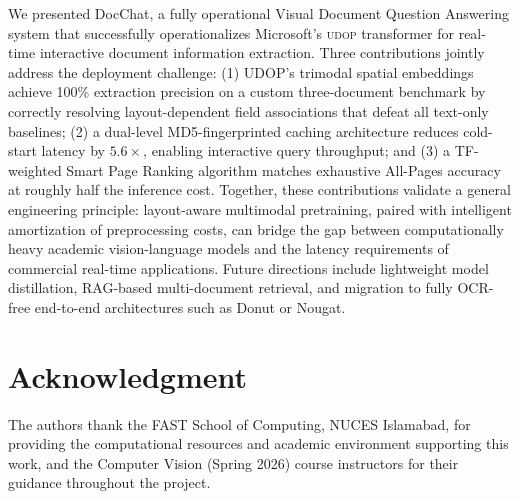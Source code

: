 \documentclass[conference]{IEEEtran}
\newcommand{\udop}{\textsc{udop}}
\begin{document}
We presented DocChat, a fully operational Visual Document Question Answering
system that successfully operationalizes Microsoft's \udop{} transformer for
real-time interactive document information extraction. Three contributions
jointly address the deployment challenge: (1) UDOP's trimodal spatial
embeddings achieve 100\% extraction precision on a custom three-document
benchmark by correctly resolving layout-dependent field associations that
defeat all text-only baselines; (2) a dual-level MD5-fingerprinted caching
architecture reduces cold-start latency by $5.6\times$, enabling interactive
query throughput; and (3) a TF-weighted Smart Page Ranking algorithm matches
exhaustive All-Pages accuracy at roughly half the inference cost. Together,
these contributions validate a general engineering principle: layout-aware
multimodal pretraining, paired with intelligent amortization of preprocessing
costs, can bridge the gap between computationally heavy academic vision-language
models and the latency requirements of commercial real-time applications.
Future directions include lightweight model distillation, RAG-based
multi-document retrieval, and migration to fully OCR-free end-to-end
architectures such as Donut or Nougat.

\section*{Acknowledgment}

The authors thank the FAST School of Computing, NUCES Islamabad, for
providing the computational resources and academic environment supporting this
work, and the Computer Vision (Spring 2026) course instructors for their
guidance throughout the project.
\end{document}
